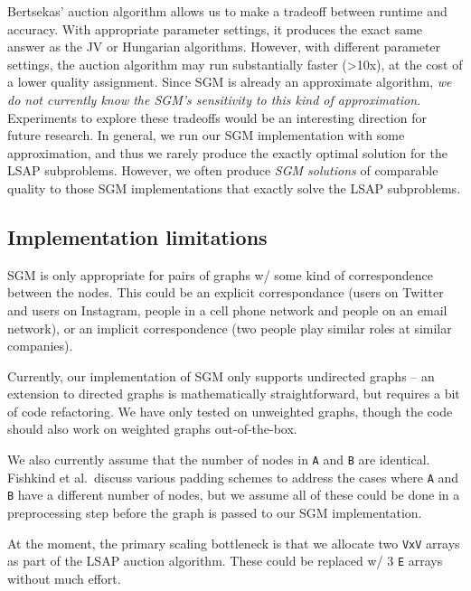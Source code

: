 \documentclass[10pt,oneside]{memoir}
\begin{document}
Bertsekas' auction algorithm allows us to make a tradeoff between
runtime and accuracy. With appropriate parameter settings, it produces
the exact same answer as the JV or Hungarian algorithms. However, with
different parameter settings, the auction algorithm may run
substantially faster (\textgreater{}10x), at the cost of a lower quality
assignment. Since SGM is already an approximate algorithm, \emph{we do
not currently know the SGM's sensitivity to this kind of approximation.}
Experiments to explore these tradeoffs would be an interesting direction
for future research. In general, we run our SGM implementation with some
approximation, and thus we rarely produce the exactly optimal solution
for the LSAP subproblems. However, we often produce \emph{SGM solutions}
of comparable quality to those SGM implementations that exactly solve
the LSAP subproblems.

\hypertarget{implementation-limitations-7}{%
\subsection{Implementation
limitations}\label{implementation-limitations-7}}

SGM is only appropriate for pairs of graphs w/ some kind of
correspondence between the nodes. This could be an explicit
correspondance (users on Twitter and users on Instagram, people in a
cell phone network and people on an email network), or an implicit
correspondence (two people play similar roles at similar companies).

Currently, our implementation of SGM only supports undirected graphs --
an extension to directed graphs is mathematically straightforward, but
requires a bit of code refactoring. We have only tested on unweighted
graphs, though the code should also work on weighted graphs
out-of-the-box.

We also currently assume that the number of nodes in \texttt{A} and
\texttt{B} are identical. Fishkind et al.~discuss various padding
schemes to address the cases where \texttt{A} and \texttt{B} have a
different number of nodes, but we assume all of these could be done in a
preprocessing step before the graph is passed to our SGM implementation.

At the moment, the primary scaling bottleneck is that we allocate two
\texttt{\textbar{}V\textbar{}x\textbar{}V\textbar{}} arrays as part of
the LSAP auction algorithm. These could be replaced w/ 3
\texttt{\textbar{}E\textbar{}} arrays without much effort.
\end{document}

